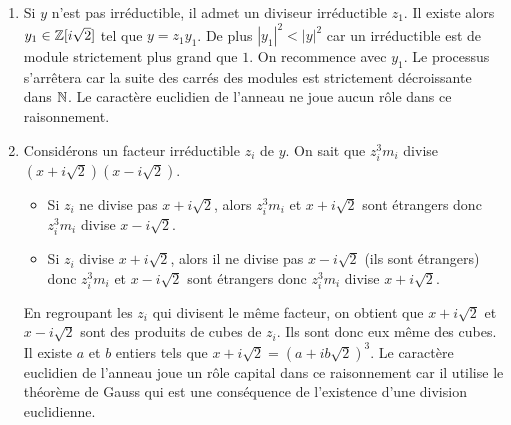 \begin{enumerate}
\begin{enumerate}
    \item Si $y$ n'est pas irréductible, il admet un diviseur irréductible $z_1$.\newline
    Il existe alors $y_1\in \mathbb{Z}[i\sqrt{2}]$ tel que $y=z_1 y_1$. De plus $|y_1|^2 < |y|^2$ car un irréductible est de module strictement plus grand que $1$. On recommence avec $y_1$. Le processus s'arrêtera car la suite des carrés des modules est strictement décroissante dans $\mathbb{N}$.\newline
    Le caractère euclidien de l'anneau ne joue aucun rôle dans ce raisonnement.
    
    \item Considérons un facteur irréductible $z_i$ de $y$. On sait que $z_i^3m_i$ divise $(x+i\sqrt{2})(x-i\sqrt{2})$.
    \begin{itemize}
      \item Si $z_i$ ne divise pas $x+i\sqrt{2}$, alors $z_i^3m_i$ et $x+i\sqrt{2}$ sont étrangers donc $z_i^3m_i$ divise $x-i\sqrt{2}$.
      \item Si $z_i$ divise $x+i\sqrt{2}$, alors il ne divise pas $x-i\sqrt{2}$ (ils sont étrangers) donc $z_i^3m_i$ et $x-i\sqrt{2}$ sont étrangers donc $z_i^3m_i$ divise $x+i\sqrt{2}$.
    \end{itemize}
En regroupant les $z_i$ qui divisent le même facteur, on obtient que $x+i\sqrt{2}$ et $x-i\sqrt{2}$ sont des produits de cubes de $z_i$. Ils sont donc eux même des cubes. Il existe $a$ et $b$ entiers tels que $x+i\sqrt{2} = (a+ib\sqrt{2})^3$.\newline
Le caractère euclidien de l'anneau joue un rôle capital dans ce raisonnement car il utilise le théorème de Gauss qui est une conséquence de l'existence d'une division euclidienne.
    

\end{enumerate}
\end{enumerate}
